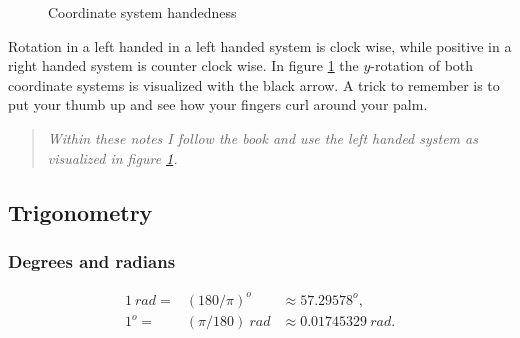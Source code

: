 \documentclass[11pt]{article}
\begin{document}
\begin{figure}[H]
\centering
\caption{Coordinate system handedness}
\label{fig:coordinate-system-handedness}
\end{figure}

Rotation in a left handed in a left handed system is clock wise, while positive in a right handed system is counter clock wise. In figure  \ref{fig:coordinate-system-handedness} the $y$-rotation of both  coordinate systems is visualized with the black arrow. A trick to remember is to put your thumb up and see how your fingers curl around your palm.

\begin{quote}
\emph{Within these notes I follow the book and use the left handed system as visualized in figure \ref{fig:coordinate-system-handedness}.}
\end{quote}

\subsection{Trigonometry}

\subsubsection{Degrees and radians}

\[
\begin{array}{rll}
{1\ {rad} =} & {\left( 180/\pi \right)^{o}} & {\approx 57.29578^{o},} \\
{1^{o} =} & {\left( \pi/180 \right)\ {rad}} & {\approx 0.01745329\ {rad}.} \\
\end{array}
\]
\end{document}

